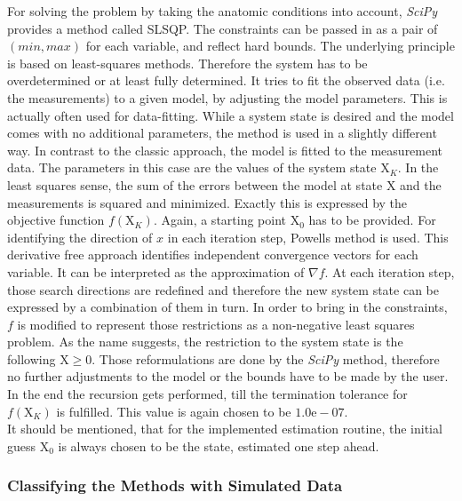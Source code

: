 For solving the problem by taking the anatomic conditions into account, \emph{SciPy} provides a method called \ac{SLSQP}. The constraints can be passed in as a pair of $ (min,max) $ for each variable, and reflect hard bounds. The underlying principle is based on least-squares methods. Therefore the system has to be overdetermined or at least fully determined. It tries to fit the observed data (i.e. the measurements) to a given model, by adjusting the model parameters. This is actually often used for data-fitting. While a system state is desired and the model comes with no additional parameters, the method is used in a slightly different way. In contrast to the classic approach, the model is fitted to the measurement data. The parameters in this case are the values of the system state $ \mathrm{X}_K $. In the least squares sense, the sum of the errors between the model at state $ \mathrm{X} $ and the measurements is squared and minimized. Exactly this is expressed by the objective function $ f(\mathrm{X}_K) $. Again, a starting point $ \mathrm{X}_{0} $ has to be provided. For identifying the direction of $ x $ in each iteration step, Powells method \cite{powell1964efficient} is used. This derivative free approach identifies independent convergence vectors for each variable. It can be interpreted as the approximation of $ \nabla f $. At each iteration step, those search directions are redefined and therefore the new system state can be expressed by a combination of them in turn. In order to bring in the constraints, $ f $ is modified to represent those restrictions as a non-negative least squares problem. As the name suggests, the restriction to the system state is the following $ \mathrm{X} \geq 0$. Those reformulations are done by the \emph{SciPy} method, therefore no further adjustments to the model or the bounds have to be made by the user. In the end the recursion gets performed, till the termination tolerance for $ f(\mathrm{X}_K) $ is fulfilled. This value is again chosen to be $ 1.0\text{e}-07 $.\\
It should be mentioned, that for the implemented estimation routine, the initial guess $ \mathrm{X}_{0} $ is always chosen to be the state, estimated one step ahead. 

\FloatBarrier
\subsubsection{Classifying the Methods with Simulated Data} \label{subsubsec:simEval}

